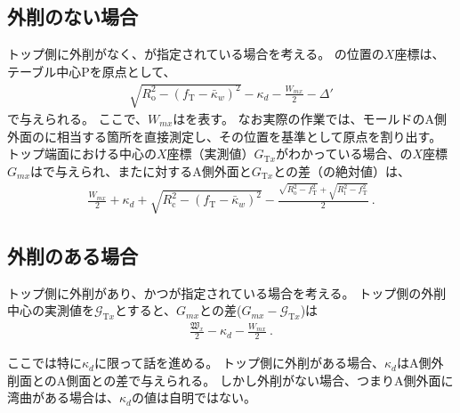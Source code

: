 \subsection{外削のない場合}
トップ側に外削がなく、\AsideKeywayDepth が指定されている場合を考える。
\KeywayCenter の位置の$X$座標は、テーブル中心Pを原点として、
\begin{align}
  \label{eq:mizocenterA}
  \sqrt{R_\mathrm o^2-(f_\mathrm T-\bar\kappa_w)^2}-\kappa_d-\frac{W_{mx}}2
  -\Delta'
\end{align}
で与えられる。
ここで、$W_{mx}$は\KeywayACOD を表す。
なお実際の作業では、モールドのA側外面の\KeywayCenter に相当する箇所を直接測定し、その位置を基準として原点を割り出す。
トップ端面における中心の$X$座標（実測値）$G_{\mathrm Tx}$がわかっている場合、\KeywayCenter の$X$座標$G_{mx}$はで与えられ、また\KeywayCenter に対するA側外面と$G_{\mathrm Tx}$との差（の絶対値）は、
\begin{align}
  \label{eq:mizocenterAd}
  \frac{W_{mx}}2+\kappa_d
  +\sqrt{R_\mathrm c^2-(f_\mathrm T-\bar\kappa_w)^2}
  -\frac{\sqrt{R_\mathrm o^2-f_\mathrm T^2}+\sqrt{R_\mathrm i^2-f_\mathrm T^2}}2\ .
\end{align}


\subsection{外削のある場合}
トップ側に外削があり、かつ\AsideKeywayDepth が指定されている場合を考える。
トップ側の外削中心の実測値を$\mathcal G_{\mathrm Tx}$とすると、\KeywayCenter$G_{mx}$との差($G_{mx}-\mathcal G_{\mathrm Tx}$)は
\begin{align}
  \label{eq:mizocenterAG}
  \frac{\mathfrak W_x}2-\kappa_d-\frac{W_{mx}}2\ .
\end{align}



\clearpage
ここでは特に\AsideKeywayDepth$\kappa_d$に限って話を進める。
トップ側に外削がある場合、$\kappa_d$はA側外削面と\Keyway のA側面との差で与えられる。
しかし外削がない場合、つまりA側外面に湾曲がある場合は、$\kappa_d$の値は自明ではない。


